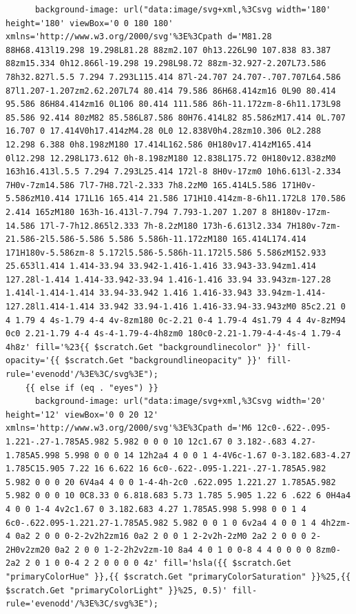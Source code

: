 \documentclass[11pt]{article}
\begin{document}
\begin{enumerate}
\begin{verbatim}
      background-image: url("data:image/svg+xml,%3Csvg width='180' height='180' viewBox='0 0 180 180' xmlns='http://www.w3.org/2000/svg'%3E%3Cpath d='M81.28 88H68.413l19.298 19.298L81.28 88zm2.107 0h13.226L90 107.838 83.387 88zm15.334 0h12.866l-19.298 19.298L98.72 88zm-32.927-2.207L73.586 78h32.827l.5.5 7.294 7.293L115.414 87l-24.707 24.707-.707.707L64.586 87l1.207-1.207zm2.62.207L74 80.414 79.586 86H68.414zm16 0L90 80.414 95.586 86H84.414zm16 0L106 80.414 111.586 86h-11.172zm-8-6h11.173L98 85.586 92.414 80zM82 85.586L87.586 80H76.414L82 85.586zM17.414 0L.707 16.707 0 17.414V0h17.414zM4.28 0L0 12.838V0h4.28zm10.306 0L2.288 12.298 6.388 0h8.198zM180 17.414L162.586 0H180v17.414zM165.414 0l12.298 12.298L173.612 0h-8.198zM180 12.838L175.72 0H180v12.838zM0 163h16.413l.5.5 7.294 7.293L25.414 172l-8 8H0v-17zm0 10h6.613l-2.334 7H0v-7zm14.586 7l7-7H8.72l-2.333 7h8.2zM0 165.414L5.586 171H0v-5.586zM10.414 171L16 165.414 21.586 171H10.414zm-8-6h11.172L8 170.586 2.414 165zM180 163h-16.413l-7.794 7.793-1.207 1.207 8 8H180v-17zm-14.586 17l-7-7h12.865l2.333 7h-8.2zM180 173h-6.613l2.334 7H180v-7zm-21.586-2l5.586-5.586 5.586 5.586h-11.172zM180 165.414L174.414 171H180v-5.586zm-8 5.172l5.586-5.586h-11.172l5.586 5.586zM152.933 25.653l1.414 1.414-33.94 33.942-1.416-1.416 33.943-33.94zm1.414 127.28l-1.414 1.414-33.942-33.94 1.416-1.416 33.94 33.943zm-127.28 1.414l-1.414-1.414 33.94-33.942 1.416 1.416-33.943 33.94zm-1.414-127.28l1.414-1.414 33.942 33.94-1.416 1.416-33.94-33.943zM0 85c2.21 0 4 1.79 4 4s-1.79 4-4 4v-8zm180 0c-2.21 0-4 1.79-4 4s1.79 4 4 4v-8zM94 0c0 2.21-1.79 4-4 4s-4-1.79-4-4h8zm0 180c0-2.21-1.79-4-4-4s-4 1.79-4 4h8z' fill='%23{{ $scratch.Get "backgroundlinecolor" }}' fill-opacity='{{ $scratch.Get "backgroundlineopacity" }}' fill-rule='evenodd'/%3E%3C/svg%3E");
    {{ else if (eq . "eyes") }}
      background-image: url("data:image/svg+xml,%3Csvg width='20' height='12' viewBox='0 0 20 12' xmlns='http://www.w3.org/2000/svg'%3E%3Cpath d='M6 12c0-.622-.095-1.221-.27-1.785A5.982 5.982 0 0 0 10 12c1.67 0 3.182-.683 4.27-1.785A5.998 5.998 0 0 0 14 12h2a4 4 0 0 1 4-4V6c-1.67 0-3.182.683-4.27 1.785C15.905 7.22 16 6.622 16 6c0-.622-.095-1.221-.27-1.785A5.982 5.982 0 0 0 20 6V4a4 4 0 0 1-4-4h-2c0 .622.095 1.221.27 1.785A5.982 5.982 0 0 0 10 0C8.33 0 6.818.683 5.73 1.785 5.905 1.22 6 .622 6 0H4a4 4 0 0 1-4 4v2c1.67 0 3.182.683 4.27 1.785A5.998 5.998 0 0 1 4 6c0-.622.095-1.221.27-1.785A5.982 5.982 0 0 1 0 6v2a4 4 0 0 1 4 4h2zm-4 0a2 2 0 0 0-2-2v2h2zm16 0a2 2 0 0 1 2-2v2h-2zM0 2a2 2 0 0 0 2-2H0v2zm20 0a2 2 0 0 1-2-2h2v2zm-10 8a4 4 0 1 0 0-8 4 4 0 0 0 0 8zm0-2a2 2 0 1 0 0-4 2 2 0 0 0 0 4z' fill='hsla({{ $scratch.Get "primaryColorHue" }},{{ $scratch.Get "primaryColorSaturation" }}%25,{{ $scratch.Get "primaryColorLight" }}%25, 0.5)' fill-rule='evenodd'/%3E%3C/svg%3E");

\end{verbatim}
\end{enumerate}
\end{document}
